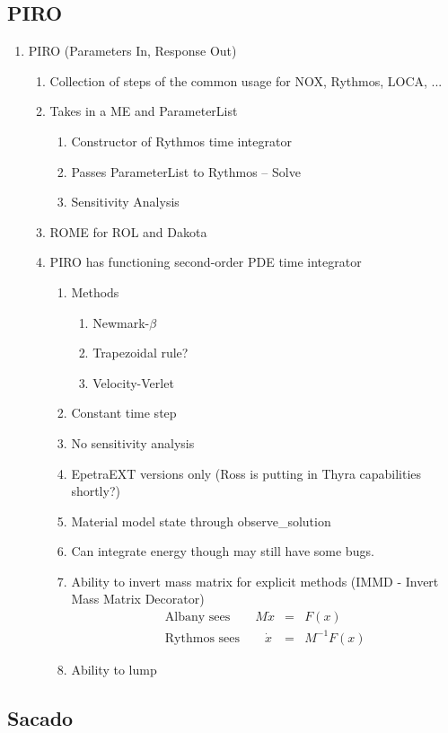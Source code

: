 \subsection{PIRO}
\begin{enumerate}
\item PIRO (Parameters In, Response Out)

\begin{enumerate}
\item Collection of steps of the common usage for NOX, Rythmos, LOCA, ...
\item Takes in a ME and ParameterList

\begin{enumerate}
\item Constructor of Rythmos time integrator
\item Passes ParameterList to Rythmos -- Solve
\item Sensitivity Analysis
\end{enumerate}
\item ROME for ROL and Dakota
\item PIRO has functioning second-order PDE time integrator

\begin{enumerate}
\item Methods

\begin{enumerate}
\item Newmark-$\beta$
\item Trapezoidal rule?
\item Velocity-Verlet
\end{enumerate}
\item Constant time step
\item No sensitivity analysis
\item EpetraEXT versions only (Ross is putting in Thyra capabilities shortly?)
\item Material model state through observe\_solution
\item Can integrate energy though may still have some bugs.
\item Ability to invert mass matrix for explicit methods (IMMD - Invert
Mass Matrix Decorator)
\begin{eqnarray*}
\mbox{Albany sees}\qquad M\dot{x} & = & F(x)\\
\mbox{Rythmos sees}\qquad\dot{x} & = & M^{-1}F(x)
\end{eqnarray*}

\item Ability to lump
\end{enumerate}
\end{enumerate}
\end{enumerate}

\subsection{Sacado}
